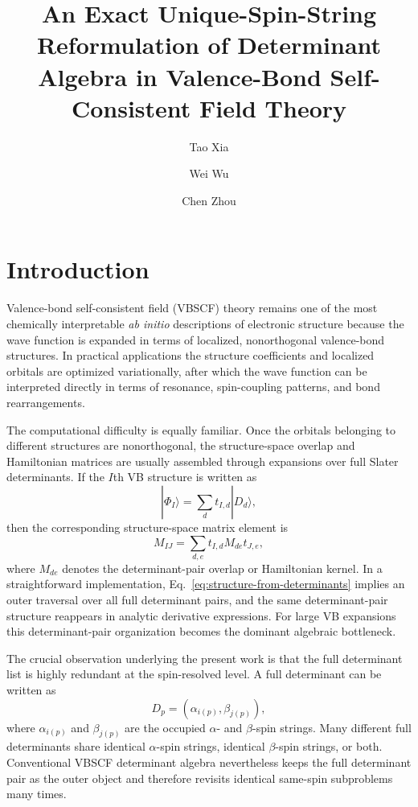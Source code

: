 \documentclass[journal=jctcce,manuscript=article]{achemso}
\author{Tao Xia}
\author{Wei Wu}
\author{Chen Zhou}
\affiliation{Department of Chemistry, Xiamen University, Xiamen 361005, Fujian, China}
\title{An Exact Unique-Spin-String Reformulation of Determinant Algebra in Valence-Bond Self-Consistent Field Theory}
\begin{document}
\section{Introduction}
Valence-bond self-consistent field (VBSCF) theory remains one of the most
chemically interpretable \textit{ab initio} descriptions of electronic
structure because the wave function is expanded in terms of localized,
nonorthogonal valence-bond structures. In practical applications the structure
coefficients and localized orbitals are optimized variationally, after which
the wave function can be interpreted directly in terms of resonance,
spin-coupling patterns, and bond rearrangements.

The computational difficulty is equally familiar. Once the orbitals belonging
to different structures are nonorthogonal, the structure-space overlap and
Hamiltonian matrices are usually assembled through expansions over full Slater
determinants. If the $I$th VB structure is written as
\begin{equation}
|\Phi_I\rangle = \sum_d t_{I,d} |D_d\rangle,
\label{eq:structure-expansion}
\end{equation}
then the corresponding structure-space matrix element is
\begin{equation}
M_{IJ} = \sum_{d,e} t_{I,d} M_{de} t_{J,e},
\label{eq:structure-from-determinants}
\end{equation}
where $M_{de}$ denotes the determinant-pair overlap or Hamiltonian kernel. In a
straightforward implementation, Eq.~\eqref{eq:structure-from-determinants}
implies an outer traversal over all full determinant pairs, and the same
determinant-pair structure reappears in analytic derivative expressions. For
large VB expansions this determinant-pair organization becomes the dominant
algebraic bottleneck.

The crucial observation underlying the present work is that the full
determinant list is highly redundant at the spin-resolved level. A full
determinant can be written as
\begin{equation}
D_p = \left( \alpha_{i(p)}, \beta_{j(p)} \right),
\label{eq:full-det-factorization}
\end{equation}
where $\alpha_{i(p)}$ and $\beta_{j(p)}$ are the occupied $\alpha$- and
$\beta$-spin strings. Many different full determinants share identical
$\alpha$-spin strings, identical $\beta$-spin strings, or both. Conventional
VBSCF determinant algebra nevertheless keeps the full determinant pair as the
outer object and therefore revisits identical same-spin subproblems many times.
\end{document}
